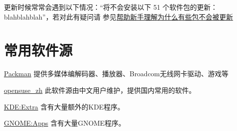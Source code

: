 \documentclass[10pt,openany]{book}
\begin{document}
更新时候常常会遇到以下情况：“将不会安装以下 51 个软件包的更新：blahblahblah”，若对此有疑问请
参见\href{https://forum.suse.org.cn/viewtopic.php?t=2777&p=21896}{帮助新手理解为什么有些包不会被更新}
\section{常用软件源}


\begin{compactdesc}
 \item[\href{http://mirrors.hust.edu.cn/packman/suse/openSUSE_13.1/}{Packman}]
 提供多媒体编解码器、播放器、Broadcom无线网卡驱动、游戏等
 \item[\href{http://download.opensuse.org/repositories/home:/opensuse_zh/openSUSE_13.1/}{opensuse\_zh}]
 此软件源由中文用户维护，提供国内常用的软件。
 \item[\href{http://download.opensuse.org/repositories/KDE:/Extra/openSUSE_13.1/}{KDE:Extra}]
 含有大量额外的KDE程序。
 \item[\href{http://download.opensuse.org/repositories/GNOME:/Apps/openSUSE_13.1/}{GNOME:Apps}]
 含有大量GNOME程序。
\end{compactdesc}
\end{document}
